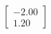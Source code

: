 \documentclass[preview]{standalone}
\begin{document}
\begin{align*}
\begin{bmatrix} -2.00 \\ 1.20 \end{bmatrix}
\end{align*}
\end{document}
